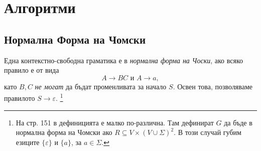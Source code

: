 \section{Алгоритми}

\subsection{Нормална Форма на Чомски}

\begin{dfn}
Една контекстно-свободна граматика е в {\em нормална форма на Чоски}, ако
всяко правило е от вида
\[A \rightarrow BC\mbox{ и }A \rightarrow a,\]
като $B, C$ {\em не могат} да бъдат променливата за начало $S$.
Освен това, позволяваме правилото $S\to\varepsilon$.
\footnote{На стр. 151 в \cite{papadimitriou} дефиницията е малко по-различна.
Там дефинират $G$ да бъде в нормална форма на Чомски ако $R \subseteq V\times(V\cup\Sigma)^2$.
В този случай губим езиците $\{\varepsilon\}$ и $\{a\}$, за $a\in\Sigma$.}
\end{dfn}

